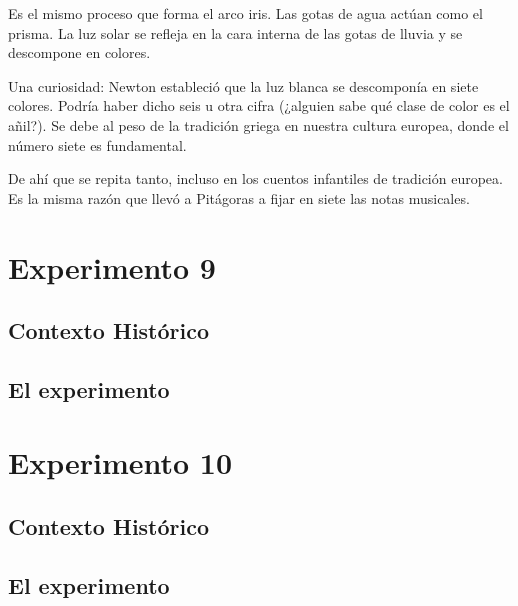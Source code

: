 \documentclass[journal]{IEEEtran}
\begin{document}
Es el mismo proceso que forma el arco iris. Las gotas de agua actúan como el prisma. La luz solar se refleja en la cara interna de las gotas de lluvia y se descompone en colores.

Una curiosidad: Newton estableció que la luz blanca se descomponía en siete colores. Podría haber dicho seis u otra cifra (¿alguien sabe qué clase de color es el añil?). Se debe al peso de la tradición griega en nuestra cultura europea, donde el número siete es fundamental. 

De ahí que se repita tanto, incluso en los cuentos infantiles de tradición europea. Es la misma razón que llevó a Pitágoras a fijar en siete las notas musicales.




\hfill \break
\section{Experimento 9}

\subsection{Contexto Histórico}

\subsection{El experimento}








\hfill \break
\section{Experimento 10}

\subsection{Contexto Histórico}

\subsection{El experimento}










\end{document}
